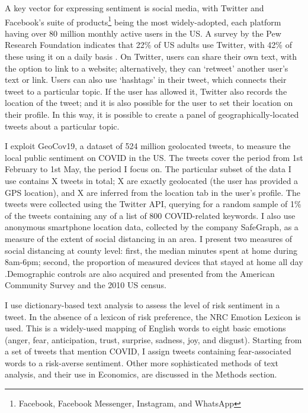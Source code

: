 \documentclass{article}
\begin{document}
A key vector for expressing sentiment is social media, with Twitter and Facebook's suite of products\footnote{Facebook, Facebook Messenger, Instagram, and WhatsApp} being the most widely-adopted, each platform having over 80 million monthly active users in the US. A survey by the Pew Research Foundation indicates that 22\% of US adults use Twitter, with 42\% of these using it on a daily basis \parencite{perrinShareAdultsUsing2019}. On Twitter, users can share their own text, with the option to link to a website; alternatively, they can `retweet' another user's text or link. Users can also use `hashtags' in their tweet, which connects their tweet to a particular topic. If the user has allowed it, Twitter also records the location of the tweet; and it is also possible for the user to set their location on their profile. In this way, it is possible to create a panel of geographically-located tweets about a particular topic. 

I exploit GeoCov19, a dataset of 524 million geolocated tweets, to measure the local public sentiment on COVID in the US. The tweets cover the period from 1st February to 1st May, the period I focus on. The particular subset of the data I use contains X tweets in total; X are exactly geolocated (the user has provided a GPS location), and X are inferred from the location tab in the user's profile. The tweets were collected using the Twitter API, querying for a random sample of 1\% of the tweets containing any of a list of 800 COVID-related keywords. I also use anonymous smartphone location data, collected by the company SafeGraph, as a measure of the extent of social distancing in an area. I present two measures of social distancing at county level: first, the median minutes spent at home during 8am-6pm; second, the proportion of measured devices that stayed at home all day \parencite{safegraphinc.SocialDistancingMetrics2020}.Demographic controls are also acquired and presented from the American Community Survey and the 2010 US census. 

I use dictionary-based text analysis to assess the level of risk sentiment in a tweet. In the absence of a lexicon of risk preference, the NRC Emotion Lexicon \parencite{mohammadCrowdsourcingWordEmotion2013} is used. This is a widely-used mapping of English words to eight basic emotions (anger, fear, anticipation, trust, surprise, sadness, joy, and disgust). Starting from a set of tweets that mention COVID, I assign tweets containing fear-associated words to a risk-averse sentiment. Other more sophisticated methods of text analysis, and their use in Economics, are discussed in the Methods section.
\end{document}
